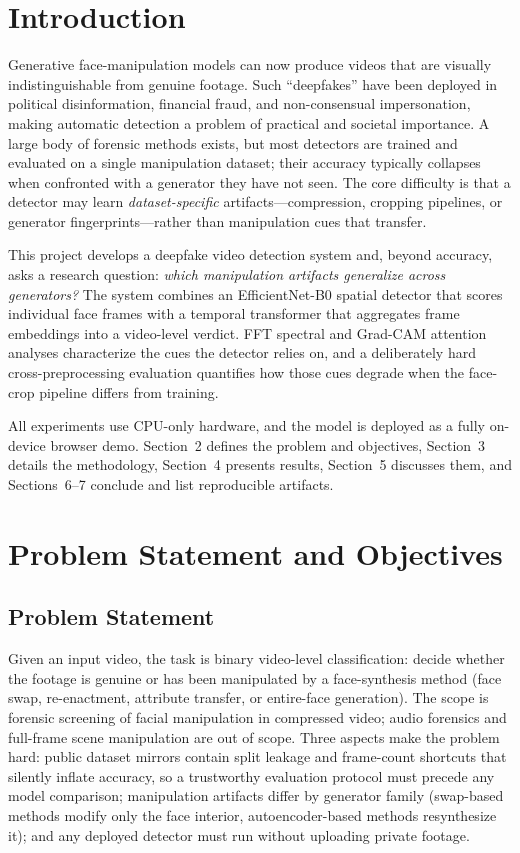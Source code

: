 \documentclass[conference]{IEEEtran}
\begin{document}
\section{Introduction}
Generative face-manipulation models can now produce videos that are visually indistinguishable from genuine footage. Such ``deepfakes'' have been deployed in political disinformation, financial fraud, and non-consensual impersonation, making automatic detection a problem of practical and societal importance. A large body of forensic methods exists, but most detectors are trained and evaluated on a single manipulation dataset; their accuracy typically collapses when confronted with a generator they have not seen. The core difficulty is that a detector may learn \emph{dataset-specific} artifacts---compression, cropping pipelines, or generator fingerprints---rather than manipulation cues that transfer.

This project develops a deepfake video detection system and, beyond accuracy, asks a research question: \emph{which manipulation artifacts generalize across generators?} The system combines an EfficientNet-B0 spatial detector that scores individual face frames with a temporal transformer that aggregates frame embeddings into a video-level verdict. FFT spectral and Grad-CAM attention analyses characterize the cues the detector relies on, and a deliberately hard cross-preprocessing evaluation quantifies how those cues degrade when the face-crop pipeline differs from training.

All experiments use CPU-only hardware, and the model is deployed as a fully on-device browser demo. Section~2 defines the problem and objectives, Section~3 details the methodology, Section~4 presents results, Section~5 discusses them, and Sections~6--7 conclude and list reproducible artifacts.

\section{Problem Statement and Objectives}
\subsection{Problem Statement}
Given an input video, the task is binary video-level classification: decide whether the footage is genuine or has been manipulated by a face-synthesis method (face swap, re-enactment, attribute transfer, or entire-face generation). The scope is forensic screening of facial manipulation in compressed video; audio forensics and full-frame scene manipulation are out of scope. Three aspects make the problem hard: public dataset mirrors contain split leakage and frame-count shortcuts that silently inflate accuracy, so a trustworthy evaluation protocol must precede any model comparison; manipulation artifacts differ by generator family (swap-based methods modify only the face interior, autoencoder-based methods resynthesize it); and any deployed detector must run without uploading private footage.
\end{document}
